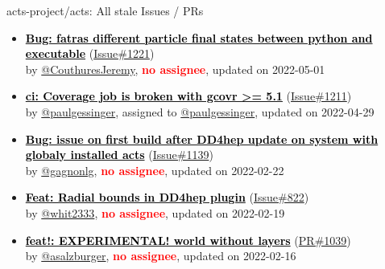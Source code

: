 \begin{frame}[allowframebreaks]{ acts-project/acts: All stale Issues / PRs}
\begin{itemize}
    \item\iss\prstale
    \hspace*{0.1em}
    \textbf{\href{https://github.com/acts-project/acts/issues/1221}{\textcolor{black}{Bug: fatras different particle final states between python and executable}}}
    (\href{https://github.com/acts-project/acts/issues/1221}{Issue\#1221}) \\
    by \href{https://github.com/CouthuresJeremy}{@CouthuresJeremy}, {}\textbf{\textcolor{Red}{no assignee}}, updated on 2022-05-01

    \item\iss\prstale
    \hspace*{0.1em}
    \textbf{\href{https://github.com/acts-project/acts/issues/1211}{\textcolor{black}{ci: Coverage job is broken with gcovr \textgreater{}= 5.1}}}
    (\href{https://github.com/acts-project/acts/issues/1211}{Issue\#1211}) \\
    by \href{https://github.com/paulgessinger}{@paulgessinger}, {}assigned to \href{https://github.com/paulgessinger}{@paulgessinger}, updated on 2022-04-29

    \item\iss\prstale
    \hspace*{0.1em}
    \textbf{\href{https://github.com/acts-project/acts/issues/1139}{\textcolor{black}{Bug: issue on first build after DD4hep update on system with globaly installed acts}}}
    (\href{https://github.com/acts-project/acts/issues/1139}{Issue\#1139}) \\
    by \href{https://github.com/gagnonlg}{@gagnonlg}, {}\textbf{\textcolor{Red}{no assignee}}, updated on 2022-02-22

    \item\iss\prstale
    \hspace*{0.1em}
    \textbf{\href{https://github.com/acts-project/acts/issues/822}{\textcolor{black}{Feat: Radial bounds in DD4hep plugin}}}
    (\href{https://github.com/acts-project/acts/issues/822}{Issue\#822}) \\
    by \href{https://github.com/whit2333}{@whit2333}, {}\textbf{\textcolor{Red}{no assignee}}, updated on 2022-02-19

    \item\propen\prwip\prstale
    \hspace*{0.1em}
    \textbf{\href{https://github.com/acts-project/acts/pull/1039}{\textcolor{black}{feat!: EXPERIMENTAL! world without layers}}}
    (\href{https://github.com/acts-project/acts/pull/1039}{PR\#1039}) \\
    by \href{https://github.com/asalzburger}{@asalzburger}, {}\textbf{\textcolor{Red}{no assignee}}, updated on 2022-02-16


\end{itemize}
\end{frame}

